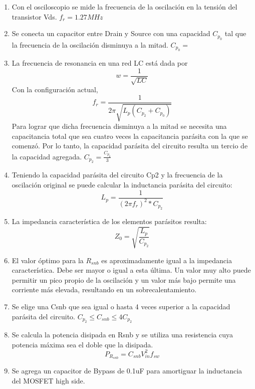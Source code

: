 \begin{enumerate}
    \item Con el osciloscopio se mide la frecuencia de la oscilación en la tensión del transistor Vds. $f_{r}=1.27MHz$ %
    \item Se conecta un capacitor entre Drain y Source con una capacidad $C_{p_{0}}$ tal que la frecuencia de la oscilación disminuya a la mitad. $C_{p_{0}}=$
    \item La frecuencia de resonancia en una red LC está dada por
    $$ w=\frac{1}{\sqrt{LC}} $$
    Con la configuración actual, 
    $$ f_{r}=\frac{1}{2\pi\sqrt{L_{p}(C_{p_{2}}+C_{p_{0}})}} $$
    Para lograr que dicha frecuencia disminuya a la mitad se necesita una capacitancia total que sea cuatro veces la capacitancia parásita con la que se comenzó.
    Por lo tanto, la capacidad parásita del circuito resulta un tercio de la capacidad agregada. $C_{p_{2}} = \frac{C_{p_{0}}}{3}$
    \item Teniendo la capacidad parásita del circuito Cp2 y la frecuencia de la oscilación original se puede calcular la inductancia parásita del circuito:
    $$ L_{p}=\frac{1}{(2\pi f_{r})^{2}*C_{p_{2}}} $$
    \item La impedancia característica de los elementos parásitos resulta:
    $$ Z_{0}=\sqrt{\frac{L_p}{C_{p_2}}} $$
    \item El valor óptimo para la $R_{snb}$ es aproximadamente igual a la impedancia característica. Debe ser mayor o igual a esta última. Un valor muy alto puede permitir un pico propio de la oscilación y un valor más bajo permite una corriente más elevada, resultando en un sobrecalentamiento.
    \item Se elige una Csnb que sea igual o hasta 4 veces superior a la capacidad parásita del circuito. $C_{p_2}\leq C_{snb}\leq 4C_{p_2}$
    \item Se calcula la potencia disipada en Rsnb y se utiliza una resistencia cuya potencia máxima sea el doble que la disipada.
    $$ P_{R_{snb}}=C_{snb}V_{in}^2f_{sw} $$
    \item Se agrega un capacitor de Bypass de 0.1uF para amortiguar la inductancia del MOSFET high side.     
\end{enumerate}